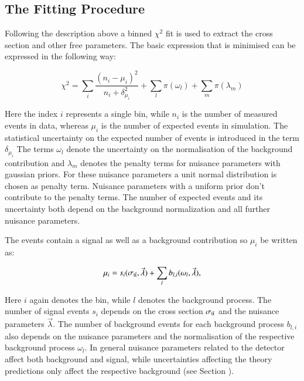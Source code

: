 	
\subsection{The Fitting Procedure}
\label{sec:xsec_stat}

Following the description above a binned $\chi^2$ fit is used to extract the cross section and other free parameters.
The basic expression that is minimised can be expressed in the following way:

\begin{equation}
  \chi^2  = \sum_{i} \frac{(n_i-\mu_i)^2}{n_i + \delta_{\mu_i}^2} + \sum_{l} \pi(\omega_l) + \sum_{m} \pi(\lambda_m)
\label{eq:xsec_chisqfunct}
\end{equation}

Here the index $i$ represents a single bin, while $n_i$ is the number of measured events in data, whereas $\mu_i$ is the number
of expected events in simulation. The statistical uncertainty on the expected number of events is introduced in the term $\delta_{\mu_i}$ The terms $\omega_l$ denote the uncertainty on the normalisation of the background contribution and $\lambda_m$
denotes the penalty terms for nuisance parameters with gaussian priors. For these nuisance parameters a unit normal distribution is chosen as penalty term. Nuisance parameters with a uniform prior don't contribute to the penalty terms.
The number of expected events and its uncertainty both depend on the background normalization and all further nuisance parameters.

The events contain a signal as well as a background contribution so $\mu_i$ be written as:

\begin{equation}
\mu_i = s_i(\sigma_\mathrm{t\bar{t}},\vec{\lambda}) 
+ \sum_{l} b_{l,i}(\omega_l,\vec{\lambda}),
\label{eq:xsec_expectev}
\end{equation} 

Here $i$ again denotes the bin, while $l$ denotes the background process. The number of signal events $s_i$ depends on the \ttbar cross section $\sigma_\mathrm{t\bar{t}}$ and the nuisance parameters $\vec{\lambda}$.
The number of background events for each background process $b_{l,i}$ also depends on the nuisance parameters and the normalisation of the respective background process $\omega_l$.
In general nuisance parameters related to the detector affect both background and signal, while uncertainties affecting the theory predictions only affect the respective background (see Section ).

